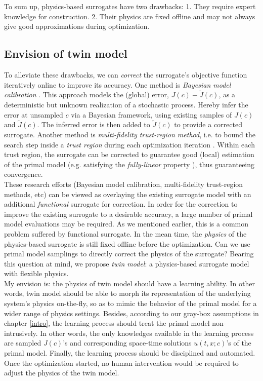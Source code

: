 \documentclass[a4paper,onecolumn]{article}
\theoremstyle{remark}
\begin{document}
\noindent To sum up, physics-based surrogates have two drawbacks:
1. They require expert knowledge for construction. 2. Their physics are fixed offline
and may not always give good approximations during optimization.\\

\subsection{Envision of twin model}
\noindent To alleviate these drawbacks, we can \emph{correct} the surrogate's objective function
iteratively online to improve its accuracy. 
One method is \emph{Bayesian model calibration}
\cite{KennedyOhagan1, andrewras}. This approach models the (global) error,
$J(c) - \tilde{J}(c)$, as a deterministic but unknown  
realization of a stochastic process. 
Hereby infer the error at unsampled $c$ via a Bayesian framework,
using existing samples of $J(c)$ and $\tilde{J}(c)$.
The inferred error is then added to $\tilde{J}(c)$ to provide a corrected surrogate.
Another method is \emph{multi-fidelity trust-region method}, i.e. to bound the search step
inside a \emph{trust region} during each optimization iteration \cite{trustregionwild}.
Within each trust region, the surrogate can be corrected to guarantee good (local) estimation
of the primal model (e.g. satisfying the \emph{fully-linear} property \cite{trustregionconn}),
thus guaranteeing convergence.\\

\noindent These research efforts (Bayesian model calibration, multi-fidelity 
trust-region methods, etc) can be viewed as overlaying the existing surrogate model with 
an additional \emph{functional}
surrogate for correction. In order for the correction to improve the existing surrogate 
to a desirable accuracy, a large number of primal model evaluations may be required.
As we mentioned earlier, this is a common problem suffered by functional surrogate.
In the mean time, the \emph{physics} of the physics-based surrogate is still fixed offline
before the optimization. Can we use primal model samplings to
directly correct the physics of the surrogate? Bearing this question at mind,
we propose \emph{twin model}: a physics-based surrogate model with flexible physics.\\

\noindent My envision is: the physics of twin model should have a learning
ability. In other words, twin model should be able to morph its representation of the 
underlying system's physics on-the-fly, so as to mimic the behavior of the primal model for
a wider range of physics settings.
Besides, according to our gray-box assumptions in chapter \ref{intro},
the learning process should treat the primal model non-intrusively.
In other words, the only knowledges available in the learning process
are sampled $J(c)$'s and corresponding space-time solutions $u(t,x;c)$'s of the primal model.
Finally, the learning process should be disciplined and automated. 
Once the optimization started, no human intervention would be required
to adjust the physics of the twin model.\\
\end{document}
